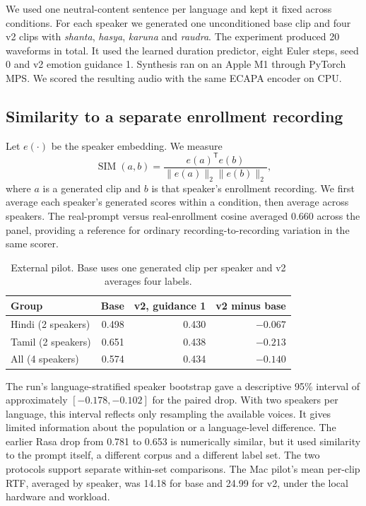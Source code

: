 \documentclass[11pt,a4paper]{article}
\begin{document}
We used one neutral-content sentence per language and kept it fixed across conditions. For each speaker we generated one unconditioned base clip and four v2 clips with \emph{shanta}, \emph{hasya}, \emph{karuna} and \emph{raudra}. The experiment produced 20 waveforms in total. It used the learned duration predictor, eight Euler steps, seed 0 and v2 emotion guidance 1. Synthesis ran on an Apple M1 through PyTorch MPS. We scored the resulting audio with the same ECAPA encoder on CPU.

\subsection{Similarity to a separate enrollment recording}
Let \(e(\cdot)\) be the speaker embedding. We measure
\[
 \operatorname{SIM}(a,b)=\frac{e(a)^{\mathsf T}e(b)}
 {\lVert e(a)\rVert_2\lVert e(b)\rVert_2},
\]
where \(a\) is a generated clip and \(b\) is that speaker's enrollment recording. We first average each speaker's generated scores within a condition, then average across speakers. The real-prompt versus real-enrollment cosine averaged 0.660 across the panel, providing a reference for ordinary recording-to-recording variation in the same scorer.

\begin{table}[!h]
\centering
\caption{External pilot. Base uses one generated clip per speaker and v2 averages four labels.}
\begin{tabular}{@{}lrrr@{}}
\toprule
Group & Base & v2, guidance 1 & v2 minus base \\
\midrule
Hindi (2 speakers) & 0.498 & 0.430 & \(-0.067\) \\
Tamil (2 speakers) & 0.651 & 0.438 & \(-0.213\) \\
All (4 speakers) & 0.574 & 0.434 & \(-0.140\) \\
\bottomrule
\end{tabular}
\end{table}

The run's language-stratified speaker bootstrap gave a descriptive 95\% interval of approximately \([-0.178,-0.102]\) for the paired drop. With two speakers per language, this interval reflects only resampling the available voices. It gives limited information about the population or a language-level difference. The earlier Rasa drop from 0.781 to 0.653 is numerically similar, but it used similarity to the prompt itself, a different corpus and a different label set. The two protocols support separate within-set comparisons. The Mac pilot's mean per-clip RTF, averaged by speaker, was 14.18 for base and 24.99 for v2, under the local hardware and workload.
\end{document}
